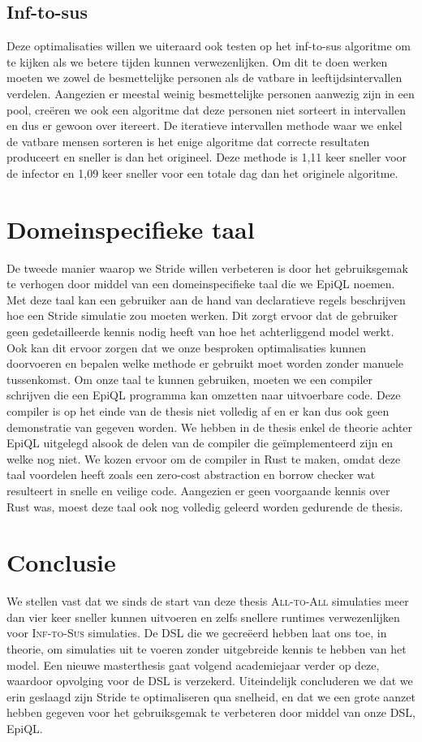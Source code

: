 \begin{appendices}
\subsection{Inf-to-sus}
Deze optimalisaties willen we uiteraard ook testen op het inf-to-sus algoritme om te kijken als we betere tijden kunnen verwezenlijken. Om dit te doen werken moeten we zowel de besmettelijke personen als de vatbare in leeftijdsintervallen verdelen. Aangezien er meestal weinig besmettelijke personen aanwezig zijn in een pool, creëren we ook een algoritme dat deze personen niet sorteert in intervallen en dus er gewoon over itereert. De iteratieve intervallen methode 
waar we enkel de vatbare mensen sorteren is het enige algoritme dat correcte resultaten produceert en sneller is dan het origineel. Deze methode is 1,11 keer sneller voor de infector en 1,09 keer sneller voor een totale dag dan het originele algoritme.

\section{Domeinspecifieke taal}
De tweede manier waarop we Stride willen verbeteren is door het gebruiksgemak te verhogen door middel van een domeinspecifieke taal die we EpiQL noemen. Met deze taal kan een gebruiker aan de hand van declaratieve regels beschrijven hoe een Stride simulatie zou moeten werken. Dit zorgt ervoor dat de gebruiker geen gedetailleerde kennis nodig heeft van hoe het achterliggend model werkt. Ook kan dit ervoor zorgen dat we onze besproken optimalisaties kunnen doorvoeren en bepalen welke methode er gebruikt moet worden zonder manuele tussenkomst. Om onze taal te kunnen gebruiken, moeten we een compiler schrijven die een EpiQL programma kan omzetten naar uitvoerbare code. Deze compiler is op het einde van de thesis niet volledig af en er kan dus ook geen demonstratie van gegeven worden. We hebben in de thesis enkel de theorie achter EpiQL uitgelegd alsook de delen van de compiler die geïmplementeerd zijn en welke nog niet. We kozen ervoor om de compiler in Rust te maken, omdat deze taal voordelen heeft zoals een zero-cost abstraction en borrow checker wat resulteert in snelle en veilige code. Aangezien er geen voorgaande kennis over Rust was, moest deze taal ook nog volledig geleerd worden gedurende de thesis.

\section{Conclusie}
We stellen vast dat we sinds de start van deze thesis \textsc{All-to-All} simulaties meer dan vier keer sneller kunnen uitvoeren en zelfs snellere runtimes verwezenlijken voor \textsc{Inf-to-Sus} simulaties. De DSL die we gecreëerd hebben laat ons toe, in theorie, om simulaties uit te voeren zonder uitgebreide kennis te hebben van het model. Een nieuwe masterthesis gaat volgend academiejaar verder op deze, waardoor opvolging voor de DSL is verzekerd. Uiteindelijk concluderen we dat we erin geslaagd zijn Stride te optimaliseren qua snelheid, en dat we een grote aanzet hebben gegeven voor het gebruiksgemak te verbeteren door middel van onze DSL, EpiQL.

\end{appendices}